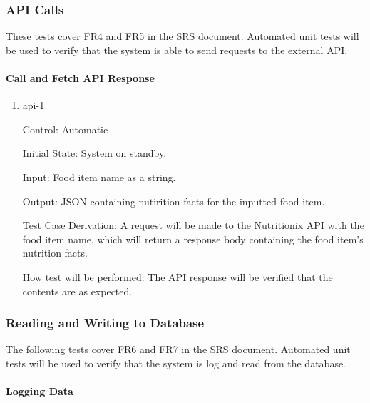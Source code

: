 \documentclass[12pt, titlepage]{article}
\begin{document}
\subsubsection{API Calls}

These tests cover  FR4 and FR5 in the SRS document. Automated unit tests will be used to verify that the system is able to send requests to the external API.

\paragraph{Call and Fetch API Response}

\begin{enumerate}
	
	\item{api-1\\}
	
	Control: Automatic
	
	Initial State: System on standby.
	
	Input: Food item name as a string.
	
	Output: JSON containing nutirition facts for the inputted food item.
	
	Test Case Derivation: A request will be made to the Nutritionix API with the food item name, which will return a response body containing the food item's nutrition facts.
	
	How test will be performed: The API response will be verified that the contents are as expected.
	
\end{enumerate}

\subsubsection{Reading and Writing to Database}

The following tests cover  FR6 and FR7 in the SRS document. Automated unit tests will be used to verify that the system is log and read from the database.

\paragraph{Logging Data}
\end{document}
